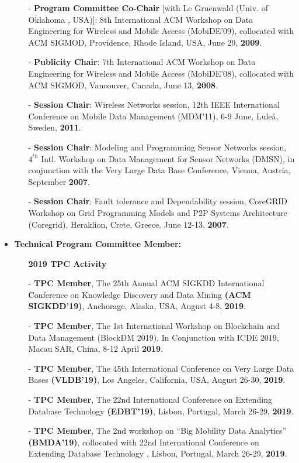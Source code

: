 \documentclass[10pt]{article}
\begin{document}
\begin{itemize}
\begin{itemize}
\item[-] {\bf Program Committee Co-Chair} [with Le Gruenwald (Univ. of Oklahoma , USA)]: 8th International ACM Workshop on Data Engineering for Wireless and Mobile Access (MobiDE'09), collocated with ACM SIGMOD, Providence, Rhode Island, USA, June 29, {\bf 2009}.
\item[-] {\bf Publicity Chair}: 7th International ACM Workshop on Data Engineering for Wireless and Mobile Access (MobiDE'08), collocated with ACM SIGMOD, Vancouver, Canada, June 13, {\bf 2008}.
\item[-] {\bf Session Chair}: Wireless Networks session, 12th IEEE International Conference on Mobile Data Management (MDM'11), 6-9 June,  Lule\aa, Sweden, {\bf 2011}.
\item[-] {\bf Session Chair}: Modeling and Programming Sensor Networks session, $4^{th}$ Intl. Workshop on Data Management for Sensor Networks (DMSN), in conjunction with the Very Large Data Base Conference, Vienna, Austria, September {\bf 2007}.
\item[-] {\bf Session Chair}: Fault tolerance and Dependability session, CoreGRID Workshop on Grid Programming Models and P2P Systems Architecture (Coregrid), Heraklion, Crete, Greece, June 12-13, {\bf 2007}.
\end{itemize}
\item {\bf Technical Program Committee Member:}
\begin{itemize}
\setlength{\itemsep}{0.10ex}
%
\vspace{0.1in}
\item[]{\bf 2019 TPC Activity\hrulefill }
%
\item[-] {\bf TPC Member}, The 25th Annual ACM SIGKDD International Conference on Knowledge Discovery and Data Mining {\bf (ACM SIGKDD'19)}, Anchorage, Alaska, USA, August 4-8, {\bf 2019}. 
\item[-] {\bf TPC Member}, The 1st International Workshop on Blockchain and Data Management (BlockDM 2019), In Conjunction with ICDE 2019, Macau SAR, China, 8-12 April {\bf 2019}.
\item[-] {\bf TPC Member}, The 45th International Conference on Very Large Data Bases {\bf (VLDB'19)}, Los Angeles, California, USA, August 26-30, {\bf 2019}.
\item[-] {\bf TPC Member}, The 22nd International Conference on Extending Database Technology {\bf (EDBT'19)}, Lisbon, Portugal, March 26-29, {\bf 2019}.
\item[-] {\bf TPC Member}, The 2nd workshop on ``Big Mobility Data Analytics'' {\bf (BMDA'19)}, collocated with 22nd International Conference on Extending Database Technology , Lisbon, Portugal, March 26-29, {\bf 2019}.


\end{itemize}
\end{itemize}
\end{document}
